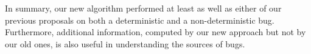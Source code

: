In summary, our new algorithm performed at least as well as either of
our previous proposals on both a deterministic and a non-deterministic
bug.     Furthermore, additional information, computed by our new
approach but not by our old ones, is also useful in understanding the
sources of bugs.







